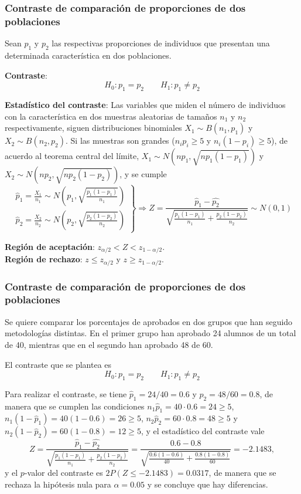 \begin{frame}
\frametitle{Contraste de comparación de proporciones de dos poblaciones}
Sean $p_1$ y $p_2$ las respectivas proporciones de individuos que presentan una determinada característica en dos poblaciones.

\textbf{Contraste}:
\[
H_0: p_1=p_2\qquad
H_1: p_1\neq p_2
\]

\textbf{Estadístico del contraste}: Las variables que miden el número de individuos con la característica en dos muestras aleatorias de tamaños $n_1$ y $n_2$ respectivamente, siguen distribuciones binomiales $X_1\sim B(n_1,p_1)$ y $X_2\sim B(n_2,p_2)$. Si las muestras son grandes ($n_ip_i\geq 5$ y $n_i(1-p_i)\geq 5$), de acuerdo al teorema central del límite, $X_1\sim N(np_1,\sqrt{np_1(1-p_1)})$ y $X_2\sim N(np_2,\sqrt{np_2(1-p_2)})$, y se cumple
{%
\[
\left.
\begin{array}{l}
\hat{p}_1=\frac{X_1}{n_1} \sim N\left(p_1,\sqrt{\frac{p_1(1-p_1)}{n_1}}\right)\\
\hat{p}_2=\frac{X_2}{n_2} \sim N\left(p_2,\sqrt{\frac{p_2(1-p_2)}{n_2}}\right)
\end{array}
\right\}
\Rightarrow Z = \frac{\hat{p}_1-\hat{p_2}}{\sqrt{\frac{p_1(1-p_1)}{n_1}+\frac{p_2(1-p_2)}{n_2}}}\sim N(0,1)
\]
}

\textbf{Región de aceptación}: $z_{\alpha/2}< Z < z_{1-\alpha/2}$.\\
\textbf{Región de rechazo}: $z\leq z_{\alpha/2}$ y $z\geq z_{1-\alpha/2}$.
\end{frame}


\begin{frame}
\frametitle{Contraste de comparación de proporciones de dos poblaciones}
Se quiere comparar los porcentajes de aprobados en dos grupos que han seguido metodologías distintas.
En el primer grupo han aprobado 24 alumnos de un total de 40, mientras que en el segundo han aprobado 48 de 60.

El contraste que se plantea es
\[
H_0: p_1=p_2\qquad
H_1: p_1\neq p_2
\]

Para realizar el contraste, se tiene $\hat{p}_1=24/40= 0.6$ y $\hat{p}_2=48/60=0.8$, de manera que se cumplen las condiciones $n_1\hat{p}_1=40\cdot 0.6=24\geq 5$, $n_1(1-\hat{p}_1)=40(1-0.6)=26\geq 5$, $n_2\hat{p}_2=60\cdot 0.8=48\geq 5$ y $n_2(1-\hat{p}_2)=60(1-0.8)=12\geq 5$, y el estadístico del contraste vale
\[
Z = \frac{\hat{p}_1-\hat{p_2}}{\sqrt{\frac{p_1(1-p_1)}{n_1}+\frac{p_2(1-p_2)}{n_2}}} = \frac{0.6-0.8}{\sqrt{\frac{0.6(1-0.6)}{40}+\frac{0.8(1-0.8)}{60}}} = -2.1483,
\]
y el $p$-valor del contraste es $2P(Z\leq -2.1483)= 0.0317$, de manera que se rechaza la hipótesis nula para $\alpha=0.05$ y se concluye que hay diferencias.
\end{frame}


